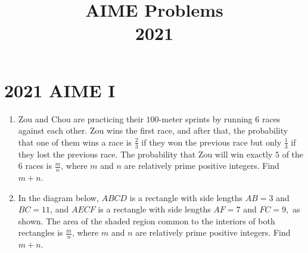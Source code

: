 \documentclass{article}
\title{AIME Problems \\ 2021}
\date{}
\begin{document}
\maketitle\thispagestyle{fancy}\newpage\section*{2021 AIME I}
\begin{enumerate}[label=\arabic*., itemsep=0.5em]
\item Zou and Chou are practicing their \(100\)-meter sprints by running \(6\) races against each other. Zou wins the first race, and after that, the probability that one of them wins a race is \(\frac23\) if they won the previous race but only \(\frac13\) if they lost the previous race. The probability that Zou will win exactly \(5\) of the \(6\) races is \(\frac mn\), where \(m\) and \(n\) are relatively prime positive integers. Find \(m+n\).\par \vspace{0.5em}\item In the diagram below, \(ABCD\) is a rectangle with side lengths \(AB=3\) and \(BC=11\), and \(AECF\) is a rectangle with side lengths \(AF=7\) and \(FC=9,\) as shown. The area of the shaded region common to the interiors of both rectangles is \(\frac mn\), where \(m\) and \(n\) are relatively prime positive integers. Find \(m+n\).



\end{enumerate}
\end{document}
